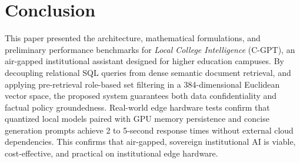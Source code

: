 \documentclass[conference]{IEEEtran}
\begin{document}
\section{Conclusion}
This paper presented the architecture, mathematical formulations, and preliminary performance benchmarks for \textit{Local College Intelligence} (C-GPT), an air-gapped institutional assistant designed for higher education campuses. By decoupling relational SQL queries from dense semantic document retrieval, and applying pre-retrieval role-based set filtering in a 384-dimensional Euclidean vector space, the proposed system guarantees both data confidentiality and factual policy groundedness. Real-world edge hardware tests confirm that quantized local models paired with GPU memory persistence and concise generation prompts achieve 2 to 5-second response times without external cloud dependencies. This confirms that air-gapped, sovereign institutional AI is viable, cost-effective, and practical on institutional edge hardware.



\end{document}
